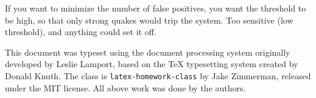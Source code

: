 \documentclass[11pt,largemargins, anonymous]{homework}
\begin{document}
\question

If you want to minimize the number of false positives,
you want the threshold to be high,
so that only strong quakes would trip the system.
Too sensitive (low threshold), and anything could set it off.


\begin{colophon}
    This document was typeset using the \LaTeXe{} document processing system
    originally developed by Leslie Lamport, based on the \TeX{} typesetting system
    created by Donald Knuth.
    The class is \texttt{latex-homework-class} by Jake Zimmerman,
    released under the MIT license.
    All above work was done by the authors.
\end{colophon}
\end{document}
